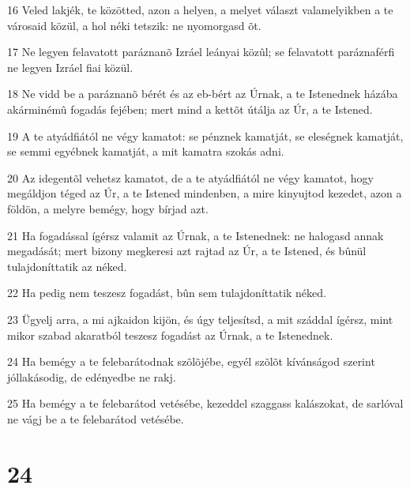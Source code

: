 \par 16 Veled lakjék, te közötted, azon a helyen, a melyet választ valamelyikben a te városaid közül, a hol néki tetszik: ne nyomorgasd õt.
\par 17 Ne legyen felavatott paráznanõ Izráel leányai közûl; se felavatott paráznaférfi ne legyen Izráel fiai közül.
\par 18 Ne vidd be a paráznanõ bérét és az eb-bért az Úrnak, a te Istenednek házába akárminémû fogadás fejében; mert mind a kettõt útálja az Úr, a te Istened.
\par 19 A te atyádfiától ne végy kamatot: se pénznek kamatját, se eleségnek kamatját, se semmi egyébnek kamatját, a mit kamatra szokás adni.
\par 20 Az idegentõl vehetsz kamatot, de a te atyádfiától ne végy kamatot, hogy megáldjon téged az Úr, a te Istened mindenben, a mire kinyujtod kezedet, azon a földön, a melyre bemégy, hogy bírjad azt.
\par 21 Ha fogadással ígérsz valamit az Úrnak, a te Istenednek: ne halogasd annak megadását; mert bizony megkeresi azt rajtad az Úr, a te Istened, és bûnül tulajdoníttatik az néked.
\par 22 Ha pedig nem teszesz fogadást, bûn sem tulajdoníttatik néked.
\par 23 Ügyelj arra, a mi ajkaidon kijön, és úgy teljesítsd, a mit száddal ígérsz, mint mikor szabad akaratból teszesz fogadást az Úrnak, a te Istenednek.
\par 24 Ha bemégy a te felebarátodnak szõlõjébe, egyél szõlõt kívánságod szerint jóllakásodig, de edényedbe ne rakj.
\par 25 Ha bemégy a te felebarátod vetésébe, kezeddel szaggass kalászokat, de sarlóval ne vágj be a te felebarátod vetésébe.

\chapter{24}

